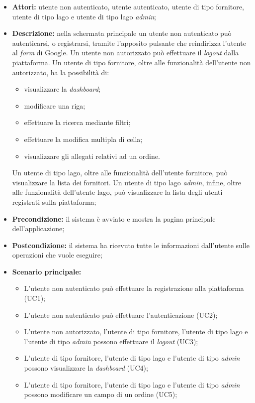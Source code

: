 \begin{itemize}
  \item \textbf{Attori:} utente non autenticato, utente autenticato, utente di tipo fornitore, utente di tipo lago e utente di tipo lago \emph{admin};
  \item \textbf{Descrizione:} nella schermata principale un utente non autenticato può autenticarsi, o registrarsi, tramite l'apposito pulsante che reindirizza l'utente al \emph{form} di Google. Un utente non autorizzato può effettuare il \emph{logout} dalla piattaforma. Un utente di tipo fornitore, oltre alle funzionalità dell'utente non autorizzato, ha la possibilità di:\
    \begin{itemize}
      \item visualizzare la \emph{dashboard};
      \item modificare una riga;
      \item effettuare la ricerca mediante filtri;
      \item effettuare la modifica multipla di cella;
      \item visualizzare gli allegati relativi ad un ordine.
    \end{itemize}
    Un utente di tipo lago, oltre alle funzionalità dell'utente fornitore, può visualizzare la lista dei fornitori. Un utente di tipo lago \emph{admin}, infine, oltre alle funzionalità dell'utente lago, può visualizzare la lista degli utenti registrati sulla piattaforma;
  \item \textbf{Precondizione:} il sistema è avviato e mostra la pagina principale dell'applicazione;
  \item \textbf{Postcondizione:} il sistema ha ricevuto tutte le informazioni dall'utente sulle operazioni che vuole eseguire;
  \item \textbf{Scenario principale:} 
    \begin{itemize}
      \item L'utente non autenticato può effettuare la registrazione alla piattaforma (UC1);
      \item L'utente non autenticato può effettuare l'autenticazione (UC2);
      \item L'utente non autorizzato, l'utente di tipo fornitore, l'utente di tipo lago e l'utente di tipo \emph{admin} possono effettuare il \emph{logout} (UC3);
      \item L'utente di tipo fornitore, l'utente di tipo lago e l'utente di tipo \emph{admin} possono visualizzare la \emph{dashboard} (UC4);
      \item L'utente di tipo fornitore, l'utente di tipo lago e l'utente di tipo \emph{admin} possono modificare un campo di un ordine (UC5);

\end{itemize}
\end{itemize}
